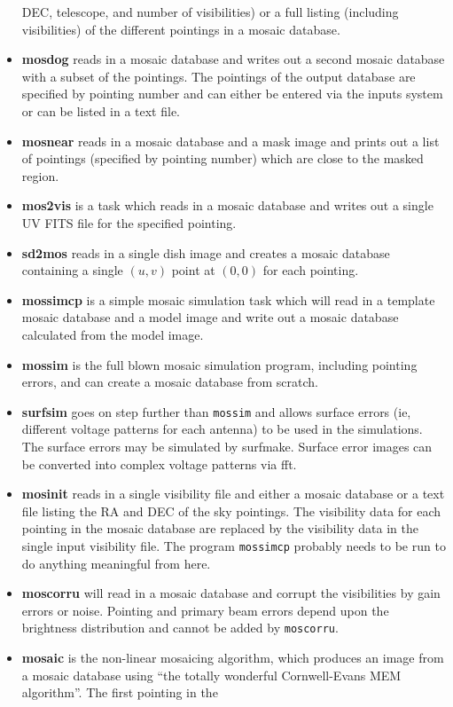 \begin{itemize}
	DEC, telescope, and number of visibilities) or a full listing
	(including visibilities) of the different pointings in a
	mosaic database.
\item {\bf mosdog} reads in a mosaic database and writes out a second mosaic
	database with a subset of the pointings.  The pointings of the output
	database are specified by pointing number and can either be entered
	via the inputs system or can be listed in a text file.
\item {\bf mosnear} reads in a mosaic database and a mask image and prints out
	a list of pointings (specified by pointing number) which are close to the
	masked region.
\item {\bf mos2vis} is a task which reads in a mosaic database and writes out
	a single UV FITS file for the specified pointing.
\item {\bf sd2mos} reads in a single dish image and creates a mosaic database
	containing a single $(u,v)$ point at $(0,0)$ for each pointing.
\item {\bf mossimcp} is a simple mosaic simulation task which will read in a template
	mosaic database and a model image and write out a mosaic database
	calculated from the model image.
\item {\bf mossim} is the full blown mosaic simulation program, including pointing
	errors, and can create a mosaic database from scratch. 
\item {\bf surfsim} goes on step further than {\tt mossim} and allows surface errors
	(ie, different voltage patterns for each antenna) to be used in the
	simulations.  The surface errors may be simulated by surfmake.  Surface
	error images can be converted into complex voltage patterns via fft.
\item {\bf mosinit} reads in a single visibility file and either a
	mosaic database or a text file listing the RA and DEC of the
	sky pointings.  The visibility data for each pointing in the
	mosaic database are replaced by the visibility data in the
	single input visibility file.  The program {\tt mossimcp} probably
	needs to be run to do anything meaningful from here.
\item {\bf moscorru} will read in a mosaic database and corrupt the visibilities
	by gain errors or noise.  Pointing and primary beam errors depend upon the
	brightness distribution and cannot be added by {\tt moscorru}.
\item {\bf mosaic} is the non-linear mosaicing algorithm, which
	produces an image from a mosaic database using ``the totally
	wonderful Cornwell-Evans MEM algorithm''.  The first pointing in the

\end{itemize}
